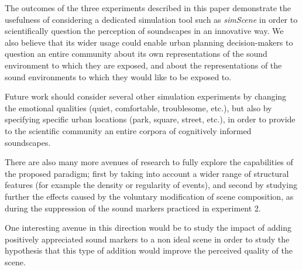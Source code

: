 \documentclass[12pt]{elsarticle}
\newcommand{\etc}{\emph{etc.}}
\begin{document}
The outcomes of the three experiments described in this paper demonstrate the usefulness of considering a dedicated simulation tool such as \emph{simScene} in order to scientifically question the perception of soundscapes in an innovative way. We also believe that its wider usage could enable urban planning decision-makers to question an entire community about its own representations of the sound environment to which they are exposed, and about the representations of the sound environments to which they would like to be exposed to.


Future work should consider several other simulation experiments by changing the emotional qualities (quiet, comfortable, troublesome, etc.), but also by specifying specific urban locations (park, square, street, etc.), in order to provide to the scientific community an entire corpora of cognitively informed soundscapes.


There are also many more avenues of research to fully explore the capabilities of the proposed paradigm; first by taking into account a wider range of structural features (for example the density or regularity of events), and second by studying further the effects caused by the voluntary modification of scene composition, as during the suppression of the sound markers practiced in experiment 2.


One interesting avenue in this direction would be to study the impact of adding positively appreciated sound markers to a non ideal scene in order to study the hypothesis that this type of addition would improve the perceived quality of the scene.
\end{document}
